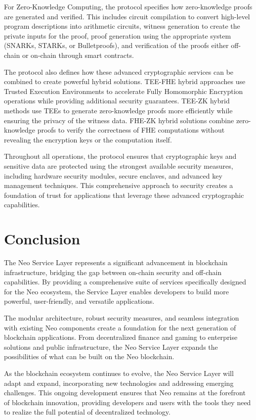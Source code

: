 \documentclass[11pt]{article}
\begin{document}
For Zero-Knowledge Computing, the protocol specifies how zero-knowledge proofs are generated and verified. This includes circuit compilation to convert high-level program descriptions into arithmetic circuits, witness generation to create the private inputs for the proof, proof generation using the appropriate system (SNARKs, STARKs, or Bulletproofs), and verification of the proofs either off-chain or on-chain through smart contracts.

The protocol also defines how these advanced cryptographic services can be combined to create powerful hybrid solutions. TEE-FHE hybrid approaches use Trusted Execution Environments to accelerate Fully Homomorphic Encryption operations while providing additional security guarantees. TEE-ZK hybrid methods use TEEs to generate zero-knowledge proofs more efficiently while ensuring the privacy of the witness data. FHE-ZK hybrid solutions combine zero-knowledge proofs to verify the correctness of FHE computations without revealing the encryption keys or the computation itself.

Throughout all operations, the protocol ensures that cryptographic keys and sensitive data are protected using the strongest available security measures, including hardware security modules, secure enclaves, and advanced key management techniques. This comprehensive approach to security creates a foundation of trust for applications that leverage these advanced cryptographic capabilities.

\section{Conclusion}
\label{subsec:nsl-conclusion}

The Neo Service Layer represents a significant advancement in blockchain infrastructure, bridging the gap between on-chain security and off-chain capabilities. By providing a comprehensive suite of services specifically designed for the Neo ecosystem, the Service Layer enables developers to build more powerful, user-friendly, and versatile applications.

The modular architecture, robust security measures, and seamless integration with existing Neo components create a foundation for the next generation of blockchain applications. From decentralized finance and gaming to enterprise solutions and public infrastructure, the Neo Service Layer expands the possibilities of what can be built on the Neo blockchain.

As the blockchain ecosystem continues to evolve, the Neo Service Layer will adapt and expand, incorporating new technologies and addressing emerging challenges. This ongoing development ensures that Neo remains at the forefront of blockchain innovation, providing developers and users with the tools they need to realize the full potential of decentralized technology.
\end{document}
